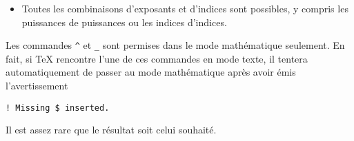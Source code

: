 \begin{itemize}
\begin{demo}
\begin{texinput}{0.2\linewidth}
\begin{lstlisting}
x_{i,j}
\end{lstlisting}
    \end{texinput}
    \quad
    \begin{texoutput}{0.1\linewidth}
      $x_{i,j}$
    \end{texoutput}
    \hfill
    \begin{texinput}{0.2\linewidth}
\begin{lstlisting}
x_{ij}^{2n}
\end{lstlisting}
    \end{texinput}
    \quad
    \begin{texoutput}{0.1\linewidth}
      $x_{ij}^{2n}$
    \end{texoutput}
  \end{demo}
\item Toutes les combinaisons d'exposants et d'indices sont possibles,
  y compris les puissances de puissances ou les indices d'indices.
\end{itemize}

\begin{important}
  Les commandes \verb=^= et \verb=_= sont permises dans le mode
  mathématique seulement. En fait, si {\TeX} rencontre l'une de ces
  commandes en mode texte, il tentera automatiquement de passer au
  mode mathématique après avoir émis l'avertissement
\begin{verbatim}
! Missing $ inserted.
\end{verbatim}
  Il est assez rare que le résultat soit celui souhaité.
\end{important}

